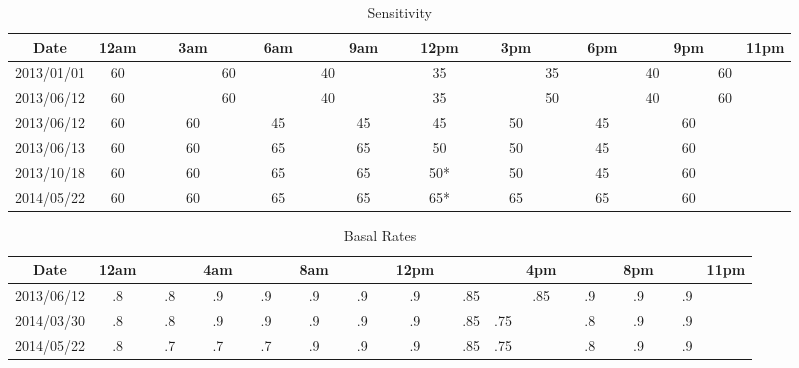 \begin{table}[h]
\caption{Sensitivity}
\footnotesize
\begin{center}
\begin{tabular}{|c|c|c|c|c|c|c|c|c|c|c|c|c|c|c|c|c|c|c|c|c|c|c|c|c|}
\hline
Date       & 12am & & & 3am &    & &6am & &    & 9am & & & 12pm & & & 3pm &    & & 6pm & &    & 9pm &    & 11pm \\ \hline
2013/01/01 & 60   & & &     & 60 & &    & & 40 &     & & & 35   & & &     & 35 & &     & & 40 &     & 60 &      \\
2013/06/12 & 60   & & &     & 60 & &    & & 40 &     & & & 35   & & &     & 50 & &     & & 40 &     & 60 &      \\
2013/06/12 & 60   & & & 60  &    & & 45 & &    & 45  & & & 45   & & & 50  &    & & 45  & &    & 60  &    &      \\
2013/06/13 & 60   & & & 60  &    & & 65 & &    & 65  & & & 50   & & & 50  &    & & 45  & &    & 60  &    &      \\
2013/10/18 & 60   & & & 60  &    & & 65 & &    & 65  & & & 50*  & & & 50  &    & & 45  & &    & 60  &    &      \\
2014/05/22 & 60   & & & 60  &    & & 65 & &    & 65  & & & 65*  & & & 65  &    & & 65  & &    & 60  &    &      \\
\hline
\end{tabular}
\end{center}
\label{default}
\end{table}%

\begin{table}[h]
\caption{Basal Rates}
\footnotesize
\begin{center}
\begin{tabular}{|c|c|c|c|c|c|c|c|c|c|c|c|c|c|c|c|c|c|c|c|c|c|c|c|c|}
\hline
Date       & 12am & &    & & 4am & &    & & 8am & &    & & 12pm & &     &     & 4pm & &    & & 8pm & &    & 11pm \\ \hline
2013/06/12 & .8   & & .8 & & .9  & & .9 & & .9  & & .9 & & .9   & & .85 &     & .85 & & .9 & & .9  & & .9 &      \\
2014/03/30 & .8   & & .8 & & .9  & & .9 & & .9  & & .9 & & .9   & & .85 & .75 &     & & .8 & & .9  & & .9 &      \\
2014/05/22 & .8   & & .7 & & .7  & & .7 & & .9  & & .9 & & .9   & & .85 & .75 &     & & .8 & & .9  & & .9 &      \\
\hline
\end{tabular}
\end{center}
\label{default}
\end{table}%

